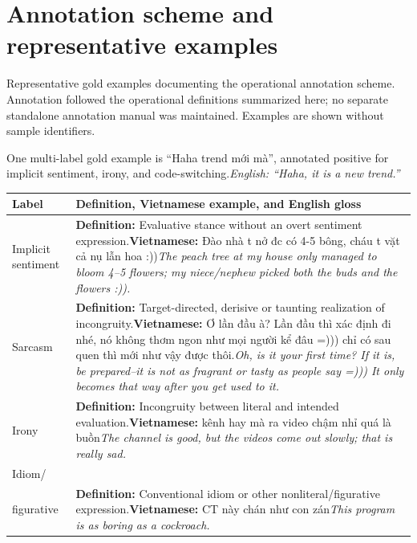 \section{Annotation scheme and representative examples}
Representative gold examples documenting the operational annotation scheme. Annotation followed the operational definitions summarized here; no separate standalone annotation manual was maintained. Examples are shown without sample identifiers.

One multi-label gold example is “Haha trend mới mà”, annotated positive for implicit sentiment, irony, and code-switching.\newline \emph{English: ``Haha, it is a new trend.''}

\begin{table}[H]
\centering
\footnotesize
\setlength{\tabcolsep}{1pt}
\begin{tabularx}{\columnwidth}{>{\raggedright\arraybackslash}p{0.80in} >{\raggedright\arraybackslash}X}
\hline
Label & Definition, Vietnamese example, and English gloss \\
\hline
Implicit sentiment & \textbf{Definition:} Evaluative stance without an overt sentiment expression.\newline\textbf{Vietnamese:} Đào nhà t nở đc có 4-5 bông, cháu t vặt cả nụ lẫn hoa :))\newline\emph{The peach tree at my house only managed to bloom 4--5 flowers; my niece/nephew picked both the buds and the flowers :)).} \\
Sarcasm & \textbf{Definition:} Target-directed, derisive or taunting realization of incongruity.\newline\textbf{Vietnamese:} Ơ lần đầu à? Lần đầu thì xác định đi nhé, nó không thơm ngon như mọi người kể đâu =))) chỉ có sau quen thì mới như vậy được thôi.\newline\emph{Oh, is it your first time? If it is, be prepared--it is not as fragrant or tasty as people say =))) It only becomes that way after you get used to it.} \\
Irony & \textbf{Definition:} Incongruity between literal and intended evaluation.\newline\textbf{Vietnamese:} kênh hay mà ra video chậm nhỉ quá là buồn\newline\emph{The channel is good, but the videos come out slowly; that is really sad.} \\
Idiom/\\figurative & \textbf{Definition:} Conventional idiom or other nonliteral/figurative expression.\newline\textbf{Vietnamese:} CT này chán như con zán\newline\emph{This program is as boring as a cockroach.} \\

\end{tabularx}
\end{table}
